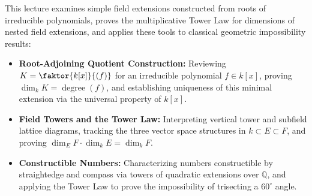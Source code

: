 


\begin{overview}
This lecture examines simple field extensions constructed from roots of irreducible polynomials, proves the multiplicative Tower Law for dimensions of nested field extensions, and applies these tools to classical geometric impossibility results:
\begin{itemize}
    \item \textbf{Root-Adjoining Quotient Construction:} Reviewing $K = \faktor{k[x]}{(f)}$ for an irreducible polynomial $f \in k[x]$, proving $\dim_k K = \operatorname{degree}(f)$, and establishing uniqueness of this minimal extension via the universal property of $k[x]$.
    \item \textbf{Field Towers and the Tower Law:} Interpreting vertical tower and subfield lattice diagrams, tracking the three vector space structures in $k \subset E \subset F$, and proving $\dim_E F \cdot \dim_k E = \dim_k F$.
    \item \textbf{Constructible Numbers:} Characterizing numbers constructible by straightedge and compass via towers of quadratic extensions over $\mathbb{Q}$, and applying the Tower Law to prove the impossibility of trisecting a $60^\circ$ angle.
\end{itemize}
\end{overview}

